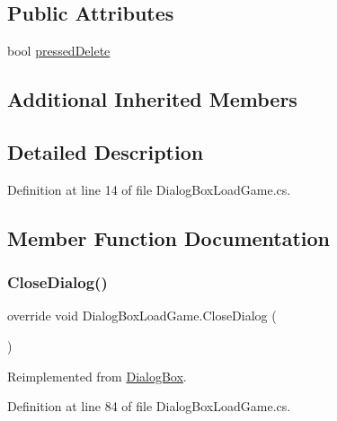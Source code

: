 \subsection*{Public Attributes}
\begin{DoxyCompactItemize}
\item 
bool \hyperlink{class_dialog_box_load_game_a1bd968f6339acae37327e0228d147d7b}{pressed\+Delete}
\end{DoxyCompactItemize}
\subsection*{Additional Inherited Members}


\subsection{Detailed Description}


Definition at line 14 of file Dialog\+Box\+Load\+Game.\+cs.



\subsection{Member Function Documentation}
\mbox{\label{class_dialog_box_load_game_ad98016aa393e94764e206cc9ef47185d}} 
\subsubsection{\texorpdfstring{Close\+Dialog()}{CloseDialog()}}
{\footnotesize\ttfamily override void Dialog\+Box\+Load\+Game.\+Close\+Dialog (\begin{DoxyParamCaption}{ }\end{DoxyParamCaption})\hspace{0.3cm}{\ttfamily [virtual]}}



Reimplemented from \hyperlink{class_dialog_box_ad4f408b78d5e109525c229ad34f5a447}{Dialog\+Box}.



Definition at line 84 of file Dialog\+Box\+Load\+Game.\+cs.

\mbox{\label{class_dialog_box_load_game_ad009c68702d76f76a3f0a09581ee1200}} 
